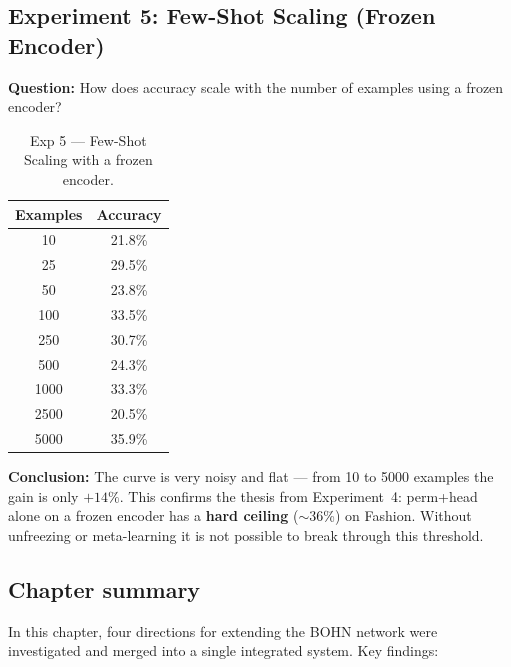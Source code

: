 \documentclass[11pt,a4paper]{report}
\begin{document}
\subsection{Experiment 5: Few-Shot Scaling (Frozen Encoder)}

\textbf{Question:} How does accuracy scale with the number of examples using a frozen encoder?

\begin{table}[h!]
\centering
\caption{Exp 5 --- Few-Shot Scaling with a frozen encoder.}
\begin{tabular}{c c}
\hline
\textbf{Examples} & \textbf{Accuracy} \\
\hline
10 & 21.8\% \\
25 & 29.5\% \\
50 & 23.8\% \\
100 & 33.5\% \\
250 & 30.7\% \\
500 & 24.3\% \\
1000 & 33.3\% \\
2500 & 20.5\% \\
5000 & 35.9\% \\
\hline
\end{tabular}
\label{tab:cpu_exp5}
\end{table}

\textbf{Conclusion:} The curve is very noisy and flat --- from 10 to 5000 examples
the gain is only $+14\%$. This confirms the thesis from Experiment~4:
perm+head alone on a frozen encoder has a \textbf{hard ceiling} ($\sim$36\%) on Fashion.
Without unfreezing or meta-learning it is not possible to break through this threshold.


\subsection*{Chapter summary}

In this chapter, four directions for extending the BOHN network were investigated and merged
into a single integrated system. Key findings:
\end{document}
